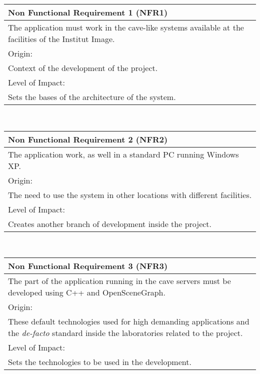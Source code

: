 \begin{center}
\begin{tabular}{p{12.6cm}}
	\hline
	{\Large Non Functional Requirement 1 (NFR1)}\\ \hline \hline
	The application must work in the cave-like systems available at the facilities of the Institut Image. \\ \hline
	\large{Origin:}\\ \hline
	Context of the development of the project.\\ \hline \hline
	\large{Level of Impact:}\\ \hline
	Sets the bases of the architecture of the system.\\
	\hline
\end{tabular}\\
\vspace{10mm}

\begin{tabular}{p{12.6cm}}
	\hline
	{\Large Non Functional Requirement 2 (NFR2)}\\ \hline \hline
	The application work, as well in a standard PC running Windows XP. \\ \hline
	\large{Origin:}\\ \hline
	The need to use the system in other locations with different facilities.\\ \hline \hline
	\large{Level of Impact:}\\ \hline
	Creates another branch of development inside the project.\\
	\hline
\end{tabular}\\
\vspace{10mm}

\begin{tabular}{p{12.6cm}}
	\hline
	{\Large Non Functional Requirement 3 (NFR3)}\\ \hline \hline
	The part of the application running in the cave servers must be developed using C++ and OpenSceneGraph. \\ \hline
	\large{Origin:}\\ \hline
	These default technologies used for high demanding applications and the \emph{de-facto} standard inside the laboratories related to the project.\\ \hline \hline
	\large{Level of Impact:}\\ \hline
	Sets the technologies to be used in the development.\\
	\hline
\end{tabular}\\
\vspace{10mm}


\end{center}

